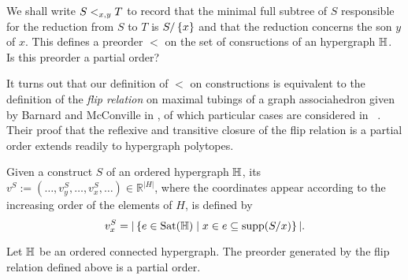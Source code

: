 We shall write $S <_{x,y} T$ to record that the  minimal full subtree of $S$ responsible for the reduction from $S$ to $T$ is $S/\left\{x\right\}$ and that the reduction concerns the son $y$ of $x$.
This defines a preorder $<$ on the set of consructions of an hypergraph ${\mathbb H}$.
Is this preorder a partial order? 

It turns out that our definition of $<$ on constructions is equivalent to the definition of the \emph{flip relation} on maximal tubings of a graph associahedron given by Barnard and McConville in \cite{Barnard-McConville}, of which particular cases are considered in ~\cite{Forcey-Tamari}.
Their proof that the reflexive and transitive closure of the flip relation is a partial order extends readily to hypergraph polytopes.

\begin{definition}
  \label{def:coordinate-vector}
  Given a construct $S$ of an ordered hypergraph ${\mathbb H}$, its 
  $v^S:=(\ldots,v^S_y,\ldots,v^S_x,\ldots) \in \mathbb{R}^{|H|}$, where the coordinates appear according to the increasing order of the elements of $H$, is defined by
  $$v^S_x=|\left\{e\in{\operatorname{Sat}}({\mathbb H}) \mid x\in e\subseteq \operatorname{supp}(S/x)\right\}|.$$
\end{definition}


\begin{proposition} 
\label{p:flip-partial-order}
Let ${\mathbb H}$ be an ordered connected hypergraph. 
The preorder generated by the flip relation defined above is a partial order.
\end{proposition}

